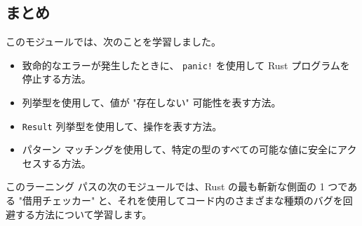 \subsection{まとめ}

このモジュールでは、次のことを学習しました。

\begin{itemize}
\item 致命的なエラーが発生したときに、 \texttt{panic!} を使用して Rust プログラムを停止する方法。
\item 列挙型を使用して、値が "存在しない" 可能性を表す方法。
\item \texttt{Result} 列挙型を使用して、操作を表す方法。
\item パターン マッチングを使用して、特定の型のすべての可能な値に安全にアクセスする方法。
\end{itemize}

このラーニング パスの次のモジュールでは、Rust の最も斬新な側面の 1 つである "借用チェッカー" と、それを使用してコード内のさまざまな種類のバグを回避する方法について学習します。